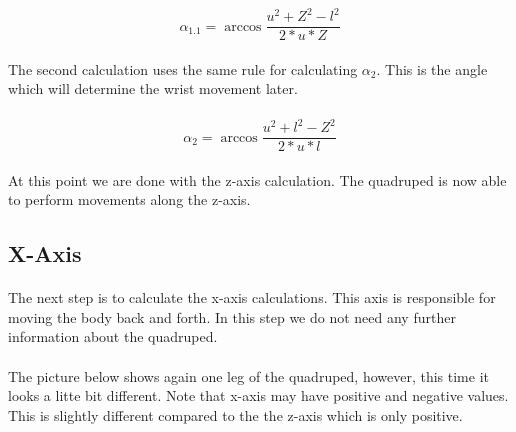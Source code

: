 \documentclass{article}
\begin{document}
    \paragraph{}

    \begin{equation} \label{alpha_1_z}
        \alpha_{1.1} = \arccos \frac{u^2 + Z^2 - l^2}{2 * u * Z} 
    \end{equation}

    \paragraph{}
    The second calculation uses the same rule for calculating $\alpha_2$. This is the angle which will determine the wrist movement later.

    \paragraph{}
    \begin{equation}
        \alpha_2 = \arccos \frac{u^2 + l^2 - Z^2}{2 * u * l} 
    \end{equation}

    \paragraph{}
    At this point we are done with the z-axis calculation. The quadruped is now able to perform movements along the z-axis.



    \pagebreak
    \subsection{X-Axis}
    \paragraph{} %
    The next step is to calculate the x-axis calculations. This axis is responsible for moving the body back and forth. In this step we do not need any further information about the quadruped.

    \paragraph{}
    The picture below shows again one leg of the quadruped, however, this time it looks a litte bit different. Note that x-axis may have positive and negative values. This is slightly different compared to the the z-axis which is only positive. 
\end{document}
